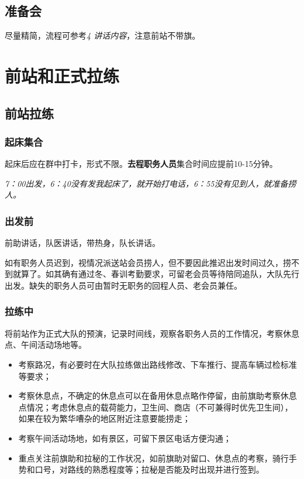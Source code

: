 \documentclass[UTF8]{ctexart}
\begin{document}
\subsection{准备会}

尽量精简，流程可参考{\color{blue}\textit{4 讲话内容}}，注意前站不带旗。

\section{前站和正式拉练}

\subsection{前站拉练}

\subsubsection{起床集合}

起床后应在群中打卡，形式不限。\textbf{去程职务人员}集合时间应提前10-15分钟。

\textit{7：00出发，6：40没有发我起床了，就开始打电话，6：55没有见到人，就准备捞人。}

\subsubsection{出发前}

前助讲话，队医讲话，带热身，队长讲话。

如有职务人员迟到，视情况派送站会员捞人，但不要因此推迟出发时间过久，捞不到就算了。如其确有通过冬、春训考勤要求，可留老会员等待陪同追队，大队先行出发。缺失的职务人员可由暂时无职务的回程人员、老会员兼任。

\subsubsection{拉练中}

将前站作为正式大队的预演，记录时间线，观察各职务人员的工作情况，考察休息点、午间活动场地等。

\begin{itemize}[nosep,left=4em]
    \item 考察路况，有必要时在大队拉练做出路线修改、下车推行、提高车辆过检标准等要求；
    \item 考察休息点，不确定的休息点可以在备用休息点略作停留，由前旗助考察休息点情况；考虑休息点的载荷能力，卫生间、商店（不可兼得时优先卫生间），如果在较为繁华嘈杂的地区附近注意要能捞走；
    \item 考察午间活动场地，如有景区，可留下景区电话方便沟通；
    \item 重点关注前旗助和拉秘的工作状况，如前旗助对留口、休息点的考察，骑行手势和口号，对路线的熟悉程度等；拉秘是否能及时出现并进行签到。
\end{itemize}
\end{document}
